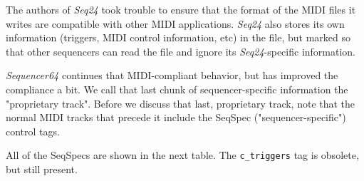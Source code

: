    The authors of \textsl{Seq24} took trouble to ensure that the format
   of the MIDI files it writes are compatible with other MIDI applications.
   \textsl{Seq24} also stores its own information (triggers, MIDI control
   information, etc) in the file, but marked so that other sequencers can read
   the file and ignore its \textsl{Seq24}-specific information.

   \textsl{Sequencer64} continues that MIDI-compliant behavior, but has
   improved the compliance a bit. 
   We call that last chunk of sequencer-specific information the "proprietary
   track".
   Before we discuss that last, proprietary track, note that the normal MIDI
   tracks that
   precede it include the SeqSpec ("sequencer-specific")
   control tags.
%
%

   All of the SeqSpecs are shown in the next table.
   The \texttt{c\_triggers} tag is obsolete, but still present.

